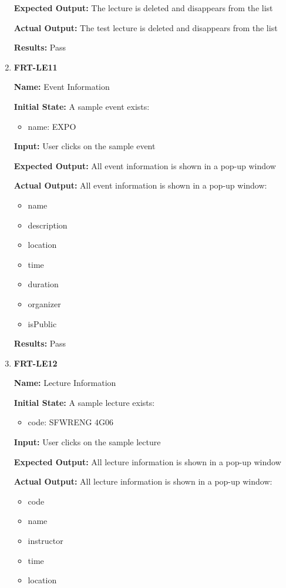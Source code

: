 \documentclass[12pt, titlepage]{article}
\begin{document}
\begin{enumerate}
\textbf{Expected Output:} The lecture is deleted and disappears from the list

\textbf{Actual Output:} The test lecture is deleted and disappears from the list

\textbf{Results:} Pass

\item \textbf{FRT-LE11}

\textbf{Name:} Event Information

\textbf{Initial State:} A sample event exists:
\begin{itemize}
\item name: EXPO
\end{itemize}

\textbf{Input:} User clicks on the sample event
					
\textbf{Expected Output:} All event information is shown in a pop-up window

\textbf{Actual Output:} All event information is shown in a pop-up window:
\begin{itemize}
\item name
\item description
\item location
\item time
\item duration
\item organizer
\item isPublic
\end{itemize}

\textbf{Results:} Pass

\item \textbf{FRT-LE12}

\textbf{Name:} Lecture Information

\textbf{Initial State:} A sample lecture exists:
\begin{itemize}
\item code: SFWRENG 4G06
\end{itemize}

\textbf{Input:} User clicks on the sample lecture
					
\textbf{Expected Output:} All lecture information is shown in a pop-up window

\textbf{Actual Output:} All lecture information is shown in a pop-up window:
\begin{itemize}
\item code
\item name
\item instructor
\item time
\item location
\end{itemize}


\end{enumerate}
\end{document}
